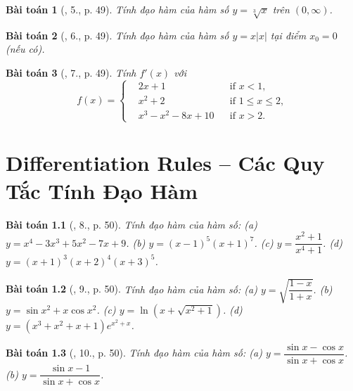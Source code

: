 \documentclass[oneside]{book}
\newtheorem{baitoan}{Bài toán}
\begin{document}
\begin{baitoan}[\cite{TLCT_BT_dai_so_giai_tich_11}, 5., p. 49]
	Tính đạo hàm của hàm số $y = \sqrt[3]{x}$ trên $(0,\infty)$.
\end{baitoan}

\begin{baitoan}[\cite{TLCT_BT_dai_so_giai_tich_11}, 6., p. 49]
	Tính đạo hàm của hàm số $y = x|x|$ tại điểm $x_0 = 0$ (nếu có).
\end{baitoan}

\begin{baitoan}[\cite{TLCT_BT_dai_so_giai_tich_11}, 7., p. 49]
	Tính $f'(x)$ với
	\begin{equation}
		f(x) = \left\{\begin{split}
			&2x + 1&&\mbox{if } x < 1,\\
			&x^2 + 2&&\mbox{if } 1\le x\le2,\\
			&x^3 - x^2 - 8x + 10&&\mbox{if } x > 2.
		\end{split}\right.
	\end{equation}
\end{baitoan}


\chapter{Differentiation Rules -- Các Quy Tắc Tính Đạo Hàm}
\minitoc

\begin{baitoan}[\cite{TLCT_BT_dai_so_giai_tich_11}, 8., p. 50]
	Tính đạo hàm của hàm số: (a) $y = x^4 - 3x^3 + 5x^2 - 7x + 9$. (b) $y = (x - 1)^5(x + 1)^7$. (c) $y = \dfrac{x^2 + 1}{x^4 + 1}$. (d) $y = (x + 1)^3(x + 2)^4(x + 3)^5$.
\end{baitoan}

\begin{baitoan}[\cite{TLCT_BT_dai_so_giai_tich_11}, 9., p. 50]
	Tính đạo hàm của hàm số: (a) $y = \sqrt{\dfrac{1 - x}{1 + x}}$. (b) $y = \sin x^2 + x\cos x^2$. (c) $y = \ln(x + \sqrt{x^2 + 1})$. (d) $y = (x^3 + x^2 + x + 1)e^{x^2 + x}$.
\end{baitoan}

\begin{baitoan}[\cite{TLCT_BT_dai_so_giai_tich_11}, 10., p. 50]
	Tính đạo hàm của hàm số: (a) $y = \dfrac{\sin x - \cos x}{\sin x + \cos x}$. (b) $y = \dfrac{\sin x - 1}{\sin x + \cos x}$.
\end{baitoan}
\end{document}
